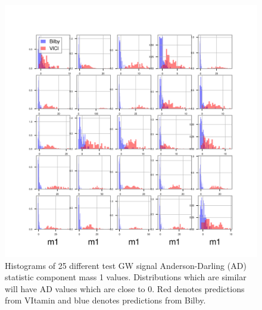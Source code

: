\documentclass[%
showpacs,
 amsmath,amssymb,
 aps,
 twocolumn,
 prl,
 reprint,
floatfix,
]{revtex4-1}
\begin{document}
%
%
\begin{figure}
    \includegraphics[width=\columnwidth]{images/hist-ad_0.png}
    \caption{\label{fig:ad_results} Histograms of 
    25 different test GW signal Anderson-Darling (AD) statistic 
    component mass 1 values. Distributions which are similar 
    will have AD values which are close to 0.
    Red denotes predictions from VItamin and blue 
    denotes predictions from Bilby.}
\end{figure}
\end{document}
